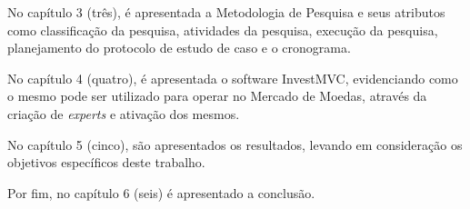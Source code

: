 No capítulo 3 (três), é apresentada a Metodologia de Pesquisa e seus atributos como classificação da pesquisa, atividades da pesquisa, execução da pesquisa, planejamento do protocolo de estudo de caso e o cronograma.

No capítulo 4 (quatro), é apresentada o software InvestMVC, evidenciando como o mesmo pode ser utilizado para operar no Mercado de Moedas, através da criação de \textit{experts} e ativação dos mesmos.

No capítulo 5 (cinco), são apresentados os resultados, levando em consideração os objetivos específicos deste trabalho.

Por fim, no capítulo 6 (seis) é apresentado a conclusão.
